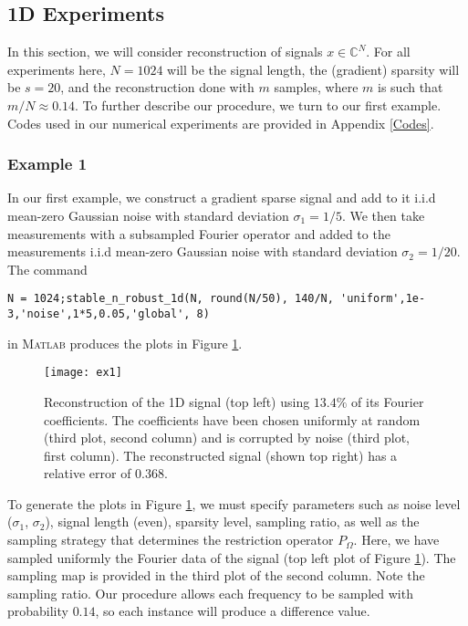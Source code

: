 \documentclass[11pt, oneside]{article}   %
\newcommand{\bC}{\mathbb{C}}
\begin{document}
\subsection{1D Experiments}
In this section, we will consider reconstruction of signals $x \in \bC^N$.  For all experiments here, $N = 1024$ will be the signal length, the (gradient) sparsity 
will be $s = 20$, and the reconstruction done with $m$ samples, where $m$ is 
such that $m/N \approx 0.14$. To further describe our procedure, we turn 
to our first example. Codes used in our numerical experiments are provided in Appendix \ref{Codes}.

\subsubsection{Example 1} 
In our first example, we construct a gradient sparse signal and add to it  
i.i.d mean-zero Gaussian noise with standard deviation $\sigma_1 = 1/5$. We 
then take measurements with a subsampled Fourier operator and added to the 
measurements i.i.d mean-zero Gaussian noise with  standard deviation $\sigma_2 
= 1/20$. The command

\begin{lstlisting}
N = 1024;stable_n_robust_1d(N, round(N/50), 140/N, 'uniform',1e-3,'noise',1*5,0.05,'global', 8)
\end{lstlisting}
in \textsc{Matlab} produces the plots in Figure \ref{ex1}.

\begin{figure}
        \centering
\texttt{[image: ex1]}
\caption{Reconstruction of the 1D signal (top left) using $13.4\%$ of its Fourier coefficients. The coefficients have been chosen uniformly at random (third plot, second column) and is corrupted by noise (third plot, first column). The reconstructed signal (shown top right) has a relative error of $0.368$. }
\label{ex1}
\end{figure}

To generate the plots in Figure \ref{ex1}, we must specify parameters such as noise level ($\sigma_1$, $\sigma_2$), signal length (even), sparsity level, sampling ratio, as well as the sampling strategy that determines the restriction operator $P_\Omega$.  Here, we have sampled uniformly the Fourier data of the signal (top left plot of Figure \ref{ex1}). The sampling map is provided in the third plot of the second column. Note the sampling ratio. Our procedure allows each frequency to be sampled with probability $0.14$, so each instance will produce a difference value.
\end{document}
